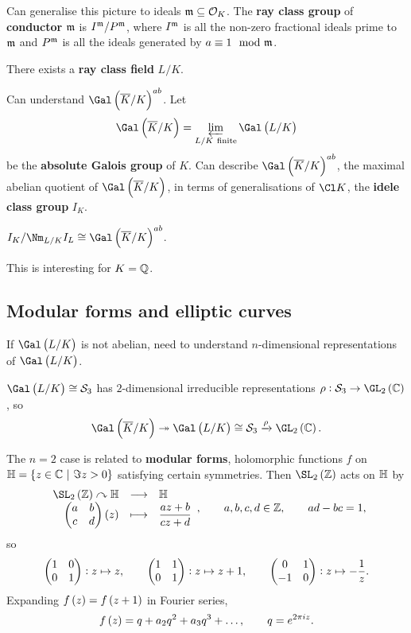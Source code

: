 \pagebreak

Can generalise this picture to ideals $ \mathfrak{m} \subseteq \mathcal{O}_K $. The \textbf{ray class group} of \textbf{conductor} $ \mathfrak{m} $ is $ I^{\mathfrak{m}} / P^{\mathfrak{m}} $, where $ I^{\mathfrak{m}} $ is all the non-zero fractional ideals prime to $ \mathfrak{m} $ and $ P^{\mathfrak{m}} $ is all the ideals generated by $ a \equiv 1 \mod {\mathfrak{m}} $.

\begin{theorem}
There exists a \textbf{ray class field} $ L / K $.
\end{theorem}

Can understand $ \Gal\br{\overline{K} / K}^{ab} $. Let
$$ \Gal\br{\overline{K} / K} = \varprojlim_{L / K \ \text{finite}} \Gal\br{L / K} $$
be the \textbf{absolute Galois group} of $ K $. Can describe $ \Gal\br{\overline{K} / K}^{ab} $, the maximal abelian quotient of $ \Gal\br{\overline{K} / K} $, in terms of generalisations of $ \Cl K $, the \textbf{idele class group} $ I_K $.

\begin{theorem}
$ I_K / \Nm_{L / K} I_L \cong \Gal\br{\overline{K} / K}^{ab} $.
\end{theorem}

This is interesting for $ K = \mathbb{Q} $.

\subsection{Modular forms and elliptic curves}

If $ \Gal\br{L / K} $ is not abelian, need to understand $ n $-dimensional representations of $ \Gal\br{L / K} $.

\begin{example*}
$ \Gal\br{L / K} \cong \SSS_3 $ has $ 2 $-dimensional irreducible representations $ \rho : \SSS_3 \to \GL_2\br{\CC} $, so
$$ \Gal\br{\overline{K} / K} \twoheadrightarrow \Gal\br{L / K} \cong \SSS_3 \xrightarrow{\rho} \GL_2\br{\CC}. $$
\end{example*}

The $ n = 2 $ case is related to \textbf{modular forms}, holomorphic functions $ f $ on $ \HH = \cbr{z \in \CC \st \Im z > 0} $ satisfying certain symmetries. Then $ \SL_2\br{\ZZ} $ acts on $ \mathbb{H} $ by
$$ \function{\SL_2\br{\ZZ} \curvearrowright \HH}{\HH}{\twobytwo{a}{b}{c}{d}\br{z}}{\dfrac{az + b}{cz + d}}, \qquad a, b, c, d \in \ZZ, \qquad ad - bc = 1, $$
so
$$ \begin{pmatrix} 1 & 0 \\ 0 & 1 \end{pmatrix} : z \mapsto z, \qquad \begin{pmatrix} 1 & 1 \\ 0 & 1 \end{pmatrix} : z \mapsto z + 1, \qquad \begin{pmatrix} 0 & 1 \\ -1 & 0 \end{pmatrix} : z \mapsto -\dfrac{1}{z}. $$
Expanding $ f\br{z} = f\br{z + 1} $ in Fourier series,
$$ f\br{z} = q + a_2q^2 + a_3q^3 + \dots, \qquad q = e^{2\pi iz}. $$

